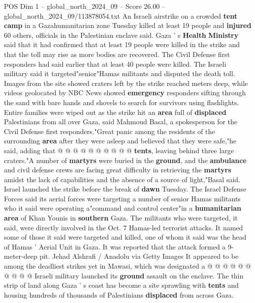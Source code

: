 \begin{textsample}{POS Dim 1 – global\_north\_2024\_09 – Score 26.00 – global\_north\_2024\_09/113878054.txt}  \label{ex:f1_pos_423}
An Israeli airstrike on a crowded \textbf{tent} \textbf{camp} in a Gazahumanitarian zone Tuesday killed at least 19 people and \textbf{injured} 60 others, officials in the Palestinian enclave said.
Gaza ' s \textbf{Health} \textbf{Ministry} said that it had confirmed that at least 19 people were killed in the strike and that the toll may rise as more bodies are recovered.
The Civil Defense first responders had said earlier that at least 40 people were killed.
The Israeli military said it targeted"senior"Hamas militants and disputed the death toll.
Images from the site showed craters left by the strike reached meters deep, while videos geolocated by NBC News showed \textbf{emergency} responders sifting through the sand with bare hands and shovels to search for survivors using flashlights.
Entire families were wiped out as the strike hit an \textbf{area} full of \textbf{displaced} Palestinians from all over Gaza, said Mahmoud Basal, a spokesperson for the Civil Defense first responders."Great panic among the residents of the surrounding \textbf{area} after they were asleep and believed that they were safe,"he said, adding that @ @ @ @ @ @ @ @ @ @ \textbf{tents}, leaving behind three large craters."A number of \textbf{martyrs} were buried in the \textbf{ground}, and the \textbf{ambulance} and civil defense crews are facing great difficulty in retrieving the \textbf{martyrs} amidst the lack of capabilities and the absence of a source of light,"Basal said.
Israel launched the strike before the break of \textbf{dawn} Tuesday.
The Israel Defense Forces said its aerial forces were targeting a number of senior Hamas militants who it said were operating a"command and control center"in a \textbf{humanitarian} \textbf{area} of Khan Younis in \textbf{southern} Gaza.
The militants who were targeted, it said, were directly involved in the Oct. 7 Hamas-led terrorist attacks.
It named some of those it said were targeted and killed, one of whom it said was the head of Hamas ' Aerial Unit in Gaza.
It was reported that the attack formed a 9-meter-deep pit.
Jehad Alshrafi / Anadolu via Getty Images It appeared to be among the deadliest strikes yet in Mawasi, which was designated a @ @ @ @ @ @ @ @ @ @ Israeli military launched its \textbf{ground} assault on the enclave.
The thin strip of land along Gaza ' s coast has become a site sprawling with \textbf{tents} and housing hundreds of thousands of Palestinians \textbf{displaced} from across Gaza.

\end{textsample}
